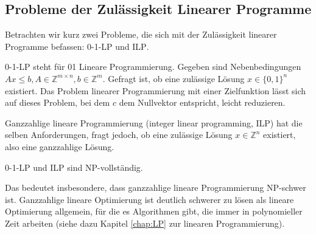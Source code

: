 \subsection{Probleme der Zulässigkeit Linearer Programme}
Betrachten wir kurz zwei Probleme, die sich mit der Zulässigkeit linearer Programme befassen: \textsc{0-1-LP} und \textsc{ILP}.

\textsc{0-1-LP} steht für 01 Lineare Programmierung. Gegeben sind Nebenbedingungen $Ax \le b, A \in \mathbb{Z}^{m \times n}, b \in \mathbb{Z}^m$. Gefragt ist, ob eine zulässige Lösung $x \in \{ 0,1 \}^n$ existiert. Das Problem linearer Programmierung mit einer Zielfunktion lässt sich auf dieses Problem, bei dem $c$ dem Nullvektor entspricht, leicht reduzieren.

Ganzzahlige lineare Programmierung (integer linear programming, \textsc{ILP}) hat die selben Anforderungen, fragt jedoch, ob eine zulässige Lösung $x \in \mathbb{Z}^n$ existiert, also eine ganzzahlige Lösung.

\begin{Satz}
  \hspace{\parindent}\textsc{0-1-LP} und \textsc{ILP} sind \textsf{NP}-vollständig.
\end{Satz}

Das bedeutet insbesondere, dass ganzzahlige lineare Programmierung \textsf{NP}-schwer ist. Ganzzahlige lineare Optimierung ist deutlich schwerer zu lösen als lineare Optimierung allgemein, für die es Algorithmen gibt, die immer in polynomieller Zeit arbeiten (siehe dazu Kapitel \ref{chap:LP} zur linearen Programmierung).

